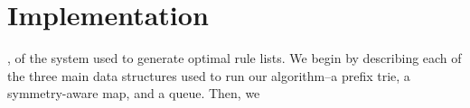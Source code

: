 \chapter{Implementation}





, of the system used to generate optimal rule lists. 
We begin by describing each of the three main data structures used to run our algorithm--a prefix trie, a symmetry-aware map, and a queue. 
Then, we 

